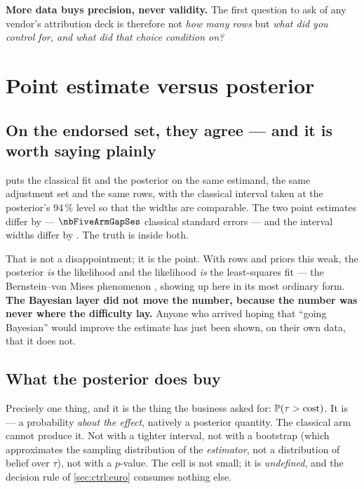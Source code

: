 

\textbf{More data buys precision, never validity.} The first question to ask of any vendor's
attribution deck is therefore not \emph{how many rows} but \emph{what did you control for, and
what did that choice condition on?}

\section{Point estimate versus posterior}
\label{sec:ctrl:compare}



\subsection*{On the endorsed set, they agree --- and it is worth saying plainly}

 puts the classical fit and the posterior on the same estimand, the same
adjustment set and the same rows, with the classical interval taken at the posterior's 94\,\%
level so that the widths are comparable. The two point estimates differ by \eur{\nbFiveArmGap}
--- $\nbFiveArmGapSes$ classical standard errors --- and the interval widths differ by
\eur{\nbFiveArmWidthGap}. The truth is inside both.

That is not a disappointment; it is the point. With \nbFiveN{} rows and priors this weak, the
posterior \emph{is} the likelihood and the likelihood \emph{is} the least-squares fit --- the
Bernstein--von Mises phenomenon \citep{gelman2013}, showing up here in its most ordinary form.
\textbf{The Bayesian layer did not move the number, because the number was never where the
difficulty lay.} Anyone who arrived hoping that ``going Bayesian'' would improve the estimate has
just been shown, on their own data, that it does not.

\subsection*{What the posterior does buy}

Precisely one thing, and it is the thing the business asked for: $\operatorname{\mathbb{P}}(\tau > \text{cost})$. It
is \nbFivePCost{} --- a probability \emph{about the effect}, natively a posterior quantity.
The classical arm cannot produce it. Not with a tighter interval, not with a bootstrap (which
approximates the sampling distribution of the \emph{estimator}, not a distribution of belief over
$\tau$), not with a $p$-value. The cell is not small; it is \emph{undefined}, and the decision
rule of \cref{sec:ctrl:euro} consumes nothing else.

